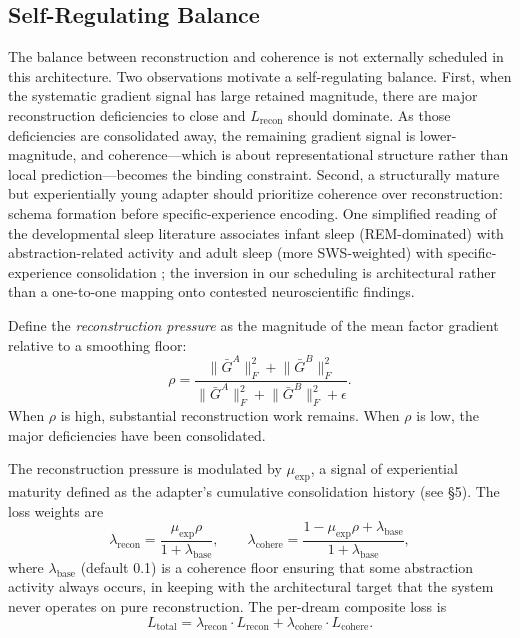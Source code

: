 \documentclass[11pt]{article}
\newcommand{\norm}[1]{\lVert #1 \rVert}
\begin{document}
\subsection{Self-Regulating Balance}

The balance between reconstruction and coherence is not externally scheduled in this architecture. Two observations motivate a self-regulating balance. First, when the systematic gradient signal has large retained magnitude, there are major reconstruction deficiencies to close and $L_\text{recon}$ should dominate. As those deficiencies are consolidated away, the remaining gradient signal is lower-magnitude, and coherence---which is about representational structure rather than local prediction---becomes the binding constraint. Second, a structurally mature but experientially young adapter should prioritize coherence over reconstruction: schema formation before specific-experience encoding. One simplified reading of the developmental sleep literature associates infant sleep (REM-dominated) with abstraction-related activity and adult sleep (more SWS-weighted) with specific-experience consolidation \cite{tononi2014}; the inversion in our scheduling is architectural rather than a one-to-one mapping onto contested neuroscientific findings.

Define the \emph{reconstruction pressure} as the magnitude of the mean factor gradient relative to a smoothing floor:
\begin{equation}\label{eq:rho}
    \rho = \frac{\norm{\bar{G}^A}_F^2 + \norm{\bar{G}^B}_F^2}{\norm{\bar{G}^A}_F^2 + \norm{\bar{G}^B}_F^2 + \epsilon}.
\end{equation}
When $\rho$ is high, substantial reconstruction work remains. When $\rho$ is low, the major deficiencies have been consolidated.

The reconstruction pressure is modulated by $\mu_\text{exp}$, a signal of experiential maturity defined as the adapter's cumulative consolidation history (see \S 5). The loss weights are
\begin{equation}
    \lambda_\text{recon} = \frac{\mu_\text{exp} \rho}{1 + \lambda_\text{base}}, \qquad \lambda_\text{cohere} = \frac{1 - \mu_\text{exp}\rho + \lambda_\text{base}}{1 + \lambda_\text{base}},
\end{equation}
where $\lambda_\text{base}$ (default 0.1) is a coherence floor ensuring that some abstraction activity always occurs, in keeping with the architectural target that the system never operates on pure reconstruction. The per-dream composite loss is
\begin{equation}
    L_\text{total} = \lambda_\text{recon} \cdot L_\text{recon} + \lambda_\text{cohere} \cdot L_\text{cohere}.
\end{equation}
\end{document}
